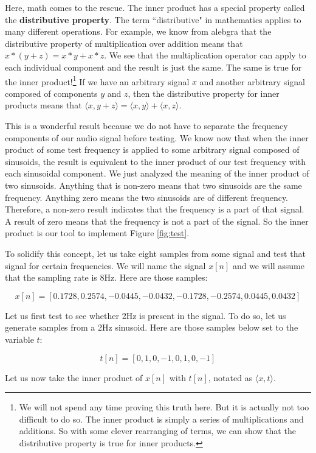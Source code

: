 Here, math comes to the rescue.  The inner product has a special property called the \textbf{distributive property}.
The term ``distributive" in mathematics applies
to many different operations.  For example, we know from alebgra that the distributive property of 
multiplication over addition means that $x * (y + z) = x * y + x * z$.  We see that the multiplication operator can apply
to each individual component and the result is just the same.  The same is true for the inner product!\footnote{We will not spend any
time proving this truth here.  But it is actually not too difficult to do so.  The inner product is simply a
series of multiplications and additions.  So with some clever rearranging of terms, we can show that 
the distributive property is true for inner products.}
If we have an arbitrary signal $x$ and another
arbitrary signal composed of components $y$ and $z$, then the distributive property for inner products 
means that  $\langle x, y + z \rangle = \langle x, y \rangle + \langle x, z \rangle$.  

This is a wonderful result because we do not have to separate the frequency components of our audio
signal before testing.  We know now that when the inner product of some test frequency is 
applied to some arbitrary signal composed of sinusoids, the result is equivalent to the inner product of
our test frequency with each sinusoidal component.  We just analyzed the meaning of the inner product
of two sinusoids.  Anything that is non-zero means that two sinusoids are the same frequency.  Anything
zero means the two sinusoids are of different frequency.  Therefore, a non-zero result
indicates that the frequency is a part of that
signal.  A result of zero means that the frequency is not a part of the signal.  So the inner product
is our tool to implement Figure \ref{fig:test}.  

To solidify this concept, let us take eight samples from some signal and test that signal for certain
frequencies.  We will name the signal $x[n]$ and we will assume that the sampling rate is 8Hz.  Here
are those samples:

$$x[n] = [0.1728, 0.2574, -0.0445, -0.0432, -0.1728, -0.2574, 0.0445, 0.0432]$$

\noindent Let us first test to see whether 2Hz is present in the signal.  To do so, let us generate samples
from a 2Hz sinusoid.  Here are those samples below set to the variable $t$:

$$t[n] = [0, 1, 0, -1, 0, 1, 0, -1]$$

\noindent Let us now take the inner product of $x[n]$ with $t[n]$, notated as $\langle x, t \rangle$.

